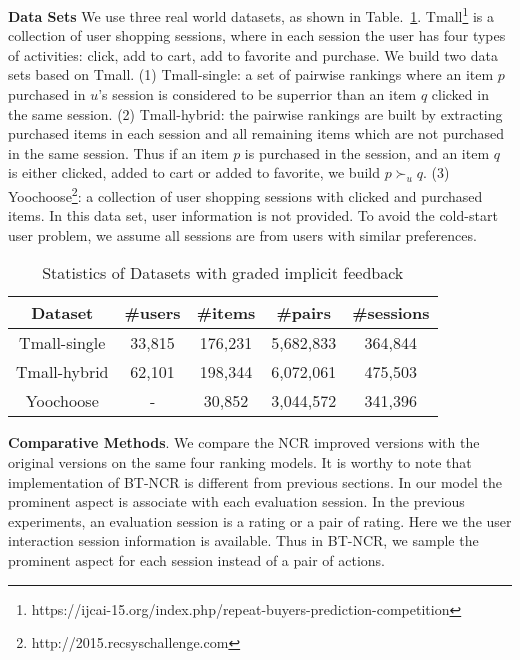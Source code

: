 \documentclass[letterpaper]{article} %
\begin{document}
\textbf{Data Sets}  We use three real world datasets, as shown in Table.~\ref{tab:idata}. Tmall\footnote{https://ijcai-15.org/index.php/repeat-buyers-prediction-competition} is a collection of user shopping sessions, where in each session the user has four types of activities: click, add to cart, add to favorite and purchase. We build two data sets based on Tmall. (1) Tmall-single: a set of pairwise rankings where an item $p$ purchased in $u$'s session is considered to be superrior than an item $q$ clicked in the same session. (2) Tmall-hybrid: the pairwise rankings are built by extracting purchased items in each session and all remaining items which are not purchased in the same session. Thus if an item $p$ is purchased in the session, and an item $q$ is either clicked, added to cart or added to favorite, we build $p\succ_u q$. (3) Yoochoose\footnote{http://2015.recsyschallenge.com}: a collection of user shopping sessions with clicked and purchased items. In this data set, user information is not provided. To avoid the cold-start user problem, we assume all sessions are from users with similar preferences.
\begin{table}[htp]
\tiny
\caption{Statistics of Datasets with graded implicit feedback}
\begin{center}
\begin{tabular}{|c|c|c|c|c|}
\hline
Dataset & \#users & \#items & \#pairs & \#sessions \\\hline
Tmall-single &33,815 &176,231 &5,682,833 &364,844 \\\hline
Tmall-hybrid &62,101 &198,344 &6,072,061 &475,503 \\\hline
Yoochoose &- &30,852 &3,044,572 &341,396 \\\hline
\end{tabular}
\end{center}
\label{tab:idata}
\end{table}%

\textbf{Comparative Methods}. We compare the NCR improved versions with the original versions on the same four ranking models. It is worthy to note that implementation of BT-NCR is different from previous sections.  In our model the prominent aspect is associate with each evaluation session. In the previous experiments, an evaluation session is a rating or a pair of rating. Here we the user interaction session information is available. Thus in BT-NCR, we sample the prominent aspect for each session instead of a pair of actions.  
\end{document}
